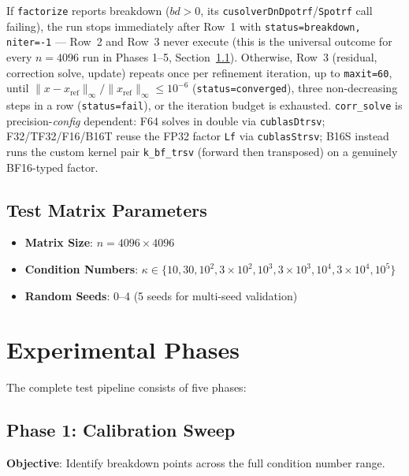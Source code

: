 \documentclass[11pt,a4paper]{article}
\begin{document}
\begin{center}
\end{center}

\noindent If \texttt{factorize} reports breakdown ($bd>0$, its
\texttt{cusolverDnDpotrf}/\texttt{Spotrf} call failing), the run stops
immediately after Row~1 with \texttt{status=breakdown, niter=-1} --- Row~2
and Row~3 never execute (this is the universal outcome for every $n{=}4096$
run in Phases 1--5, Section~\ref{sec:phase1}). Otherwise, Row~3 (residual,
correction solve, update) repeats once per refinement iteration, up to
\texttt{maxit=60}, until $\lVert x-x_{\mathrm{ref}}\rVert_\infty /
\lVert x_{\mathrm{ref}}\rVert_\infty \leq 10^{-6}$ (\texttt{status=converged}),
three non-decreasing steps in a row (\texttt{status=fail}), or the iteration
budget is exhausted. \texttt{corr\_solve} is precision-\emph{config}
dependent: F64 solves in double via \texttt{cublasDtrsv}; F32/TF32/F16/B16T
reuse the FP32 factor \texttt{Lf} via \texttt{cublasStrsv}; B16S instead runs
the custom kernel pair \texttt{k\_bf\_trsv} (forward then transposed) on a
genuinely BF16-typed factor.

\subsection{Test Matrix Parameters}
\begin{itemize}
  \item \textbf{Matrix Size}: $n = 4096 \times 4096$
  \item \textbf{Condition Numbers}: $\kappa \in \{10, 30, 10^2, 3 \times 10^2, 10^3, 3 \times 10^3, 10^4, 3 \times 10^4, 10^5\}$
  \item \textbf{Random Seeds}: 0--4 (5 seeds for multi-seed validation)
\end{itemize}

\section{Experimental Phases}

The complete test pipeline consists of five phases:

\subsection{Phase 1: Calibration Sweep}
\label{sec:phase1}
\textbf{Objective}: Identify breakdown points across the full condition number range.
\end{document}
